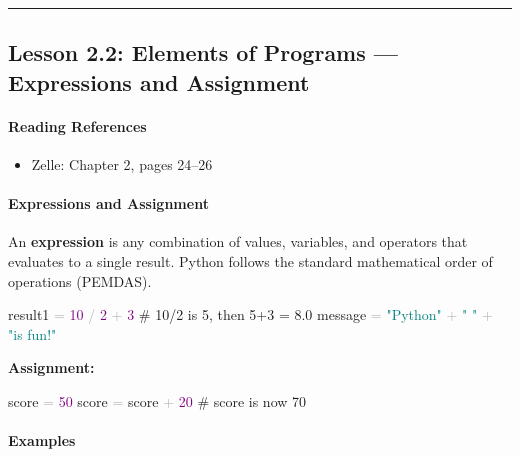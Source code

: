 \documentclass[
  justified,
  openright,
]{tufte-book}
\let\subsubsection\paragraph
\let\paragraph\paragraph
\newcommand{\CommentTok}[1]{\textcolor{MidGray}{#1}}
\newcommand{\DecValTok}[1]{\textcolor{Purple}{#1}}
\newcommand{\NormalTok}[1]{#1}
\newcommand{\OperatorTok}[1]{\textcolor{DarkGray}{#1}}
\newcommand{\StringTok}[1]{\textcolor{Teal}{#1}}
\newenvironment{Shaded}{%
  \begin{snugshade}
}{%
  \end{snugshade}
}
\let\subsubsection\paragraph
\let\paragraph\paragraph
\providecommand{\tightlist}{%
  \setlength{\itemsep}{0pt}\setlength{\parskip}{0pt}}
\begin{document}
\begin{center}\rule{0.5\linewidth}{0.5pt}\end{center}

\subsection{Lesson 2.2: Elements of Programs --- Expressions and
Assignment}\label{lesson-2.2-elements-of-programs-expressions-and-assignment}

\subsubsection{Reading References}\label{reading-references-8}

\begin{itemize}
\tightlist
\item
  Zelle: Chapter 2, pages 24--26
\end{itemize}

\subsubsection{Expressions and
Assignment}\label{expressions-and-assignment}

An \textbf{expression} is any combination of values, variables, and
operators that evaluates to a single result. Python follows the standard
mathematical order of operations (PEMDAS).

\begin{Shaded}
\begin{Highlighting}[]
\NormalTok{result1 }\OperatorTok{=} \DecValTok{10} \OperatorTok{/} \DecValTok{2} \OperatorTok{+} \DecValTok{3}  \CommentTok{\# 10/2 is 5, then 5+3 = 8.0}
\NormalTok{message }\OperatorTok{=} \StringTok{"Python"} \OperatorTok{+} \StringTok{" "} \OperatorTok{+} \StringTok{"is fun!"}
\end{Highlighting}
\end{Shaded}

\textbf{Assignment:}

\begin{Shaded}
\begin{Highlighting}[]
\NormalTok{score }\OperatorTok{=} \DecValTok{50}
\NormalTok{score }\OperatorTok{=}\NormalTok{ score }\OperatorTok{+} \DecValTok{20}  \CommentTok{\# score is now 70}
\end{Highlighting}
\end{Shaded}

\subsubsection{Examples}\label{examples-2}
\end{document}

